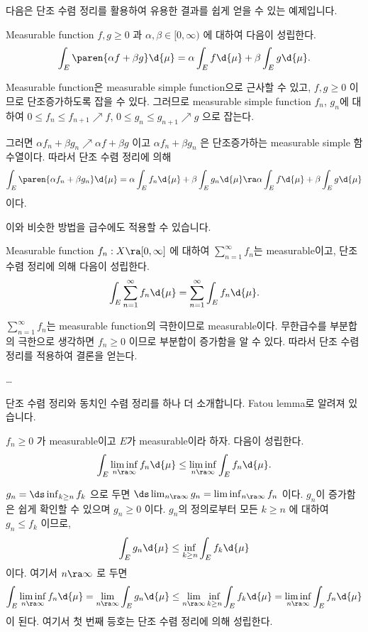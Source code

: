 \bigskip

다음은 단조 수렴 정리를 활용하여 유용한 결과를 쉽게 얻을 수 있는 예제입니다.

\rmk Measurable function \(f, g \geq 0\) 과 \(\alpha, \beta \in [0, \infty)\) 에 대하여 다음이 성립한다.
\[
    \int_E \paren{\alpha f + \beta g} \d{\mu} = \alpha \int_E f \d{\mu} + \beta \int_E g\d{\mu}.
\]

\pf Measurable function은 measurable simple function으로 근사할 수 있고, \(f, g \geq 0\) 이므로 단조증가하도록 잡을 수 있다. 그러므로 measurable simple function \(f_n\), \(g_n\)에 대하여 \(0 \leq f_n \leq f_{n+1} \nearrow f\), \(0 \leq g_n \leq g_{n+1} \nearrow g\) 으로 잡는다.

그러면 \(\alpha f_n + \beta g_n \nearrow \alpha f + \beta g\) 이고 \(\alpha f_n + \beta g_n\) 은 단조증가하는 measurable simple 함수열이다. 따라서 단조 수렴 정리에 의해
\[
    \int_E \paren{\alpha f_n + \beta g_n} \d{\mu} = \alpha \int_E f_n \d{\mu} + \beta \int_E g_n \d{\mu} \ra \alpha \int_E f \d{\mu} + \beta \int_E g\d{\mu}
\]
이다.

이와 비슷한 방법을 급수에도 적용할 수 있습니다.

 Measurable function \(f_n: X \ra [0, \infty]\) 에 대하여 \(\sum_{n=1}^\infty f_n\)는 measurable이고, 단조 수렴 정리에 의해 다음이 성립한다.
\[
    \int_E \sum_{n=1}^\infty f_n \d{\mu} = \sum_{n=1}^\infty \int_E f_n \d{\mu}.
\]

\pf \(\sum_{n=1}^\infty f_n\)는 measurable function의 극한이므로 measurable이다. 무한급수를 부분합의 극한으로 생각하면 \(f_n \geq 0\) 이므로 부분합이 증가함을 알 수 있다. 따라서 단조 수렴 정리를 적용하여 결론을 얻는다.

\dots

단조 수렴 정리와 동치인 수렴 정리를 하나 더 소개합니다. Fatou lemma로 알려져 있습니다.

  \(f_n \geq 0\) 가 measurable이고 \(E\)가 measurable이라 하자. 다음이 성립한다.
\[
    \int_E \liminf_{n\ra\infty} f_n \d{\mu} \leq \liminf_{n\ra\infty} \int_E f_n \d{\mu}.
\]

\pf \(g_n = \ds \inf_{k \geq n} f_k\) 으로 두면 \(\ds \lim_{n \ra \infty} g_n = \liminf_{n\ra\infty} f_n\) 이다. \(g_n\)이 증가함은 쉽게 확인할 수 있으며 \(g_n \geq 0\) 이다. \(g_n\)의 정의로부터 모든 \(k \geq n\) 에 대하여 \(g_n \leq f_k\) 이므로,
\[
    \int_E g_n \d{\mu} \leq \inf_{k\geq n} \int_E f_k \d{\mu}
\]
이다. 여기서 \(n \ra \infty\) 로 두면
\[
    \int_E \liminf_{n\ra\infty} f_n \d{\mu} = \lim_{n \ra \infty} \int_E g_n \d{\mu} \leq \lim_{n \ra \infty} \inf_{k \geq n}\int_E f_k \d{\mu} = \liminf_{n \ra \infty} \int_E f_n \d{\mu}
\]
이 된다. 여기서 첫 번째 등호는 단조 수렴 정리에 의해 성립한다.

